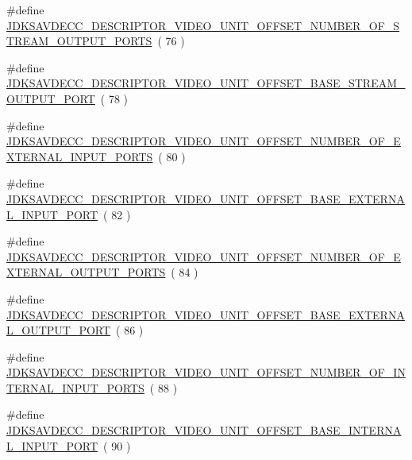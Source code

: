 \begin{DoxyCompactItemize}
\#define \hyperlink{group__descriptor__video_gac7fe011b0b2e1939152afdadbeada41d}{J\+D\+K\+S\+A\+V\+D\+E\+C\+C\+\_\+\+D\+E\+S\+C\+R\+I\+P\+T\+O\+R\+\_\+\+V\+I\+D\+E\+O\+\_\+\+U\+N\+I\+T\+\_\+\+O\+F\+F\+S\+E\+T\+\_\+\+N\+U\+M\+B\+E\+R\+\_\+\+O\+F\+\_\+\+S\+T\+R\+E\+A\+M\+\_\+\+O\+U\+T\+P\+U\+T\+\_\+\+P\+O\+R\+TS}~( 76 )
\item 
\#define \hyperlink{group__descriptor__video_ga338f69aa7d516eebf27652ef488e0ddb}{J\+D\+K\+S\+A\+V\+D\+E\+C\+C\+\_\+\+D\+E\+S\+C\+R\+I\+P\+T\+O\+R\+\_\+\+V\+I\+D\+E\+O\+\_\+\+U\+N\+I\+T\+\_\+\+O\+F\+F\+S\+E\+T\+\_\+\+B\+A\+S\+E\+\_\+\+S\+T\+R\+E\+A\+M\+\_\+\+O\+U\+T\+P\+U\+T\+\_\+\+P\+O\+RT}~( 78 )
\item 
\#define \hyperlink{group__descriptor__video_gac8a77b254c974dd066c13ee46e44e867}{J\+D\+K\+S\+A\+V\+D\+E\+C\+C\+\_\+\+D\+E\+S\+C\+R\+I\+P\+T\+O\+R\+\_\+\+V\+I\+D\+E\+O\+\_\+\+U\+N\+I\+T\+\_\+\+O\+F\+F\+S\+E\+T\+\_\+\+N\+U\+M\+B\+E\+R\+\_\+\+O\+F\+\_\+\+E\+X\+T\+E\+R\+N\+A\+L\+\_\+\+I\+N\+P\+U\+T\+\_\+\+P\+O\+R\+TS}~( 80 )
\item 
\#define \hyperlink{group__descriptor__video_gaf2e1ab9c5796bc2211191a29ca4585e6}{J\+D\+K\+S\+A\+V\+D\+E\+C\+C\+\_\+\+D\+E\+S\+C\+R\+I\+P\+T\+O\+R\+\_\+\+V\+I\+D\+E\+O\+\_\+\+U\+N\+I\+T\+\_\+\+O\+F\+F\+S\+E\+T\+\_\+\+B\+A\+S\+E\+\_\+\+E\+X\+T\+E\+R\+N\+A\+L\+\_\+\+I\+N\+P\+U\+T\+\_\+\+P\+O\+RT}~( 82 )
\item 
\#define \hyperlink{group__descriptor__video_ga4aed93d1545c2ea73f68e8aba44f9642}{J\+D\+K\+S\+A\+V\+D\+E\+C\+C\+\_\+\+D\+E\+S\+C\+R\+I\+P\+T\+O\+R\+\_\+\+V\+I\+D\+E\+O\+\_\+\+U\+N\+I\+T\+\_\+\+O\+F\+F\+S\+E\+T\+\_\+\+N\+U\+M\+B\+E\+R\+\_\+\+O\+F\+\_\+\+E\+X\+T\+E\+R\+N\+A\+L\+\_\+\+O\+U\+T\+P\+U\+T\+\_\+\+P\+O\+R\+TS}~( 84 )
\item 
\#define \hyperlink{group__descriptor__video_gadb2256708754bd25d9b731eb80addf35}{J\+D\+K\+S\+A\+V\+D\+E\+C\+C\+\_\+\+D\+E\+S\+C\+R\+I\+P\+T\+O\+R\+\_\+\+V\+I\+D\+E\+O\+\_\+\+U\+N\+I\+T\+\_\+\+O\+F\+F\+S\+E\+T\+\_\+\+B\+A\+S\+E\+\_\+\+E\+X\+T\+E\+R\+N\+A\+L\+\_\+\+O\+U\+T\+P\+U\+T\+\_\+\+P\+O\+RT}~( 86 )
\item 
\#define \hyperlink{group__descriptor__video_gaa4d68bd7591869919314268f9d0baa76}{J\+D\+K\+S\+A\+V\+D\+E\+C\+C\+\_\+\+D\+E\+S\+C\+R\+I\+P\+T\+O\+R\+\_\+\+V\+I\+D\+E\+O\+\_\+\+U\+N\+I\+T\+\_\+\+O\+F\+F\+S\+E\+T\+\_\+\+N\+U\+M\+B\+E\+R\+\_\+\+O\+F\+\_\+\+I\+N\+T\+E\+R\+N\+A\+L\+\_\+\+I\+N\+P\+U\+T\+\_\+\+P\+O\+R\+TS}~( 88 )
\item 
\#define \hyperlink{group__descriptor__video_gad9ab75e849620219e86d9ee9ef19ea3b}{J\+D\+K\+S\+A\+V\+D\+E\+C\+C\+\_\+\+D\+E\+S\+C\+R\+I\+P\+T\+O\+R\+\_\+\+V\+I\+D\+E\+O\+\_\+\+U\+N\+I\+T\+\_\+\+O\+F\+F\+S\+E\+T\+\_\+\+B\+A\+S\+E\+\_\+\+I\+N\+T\+E\+R\+N\+A\+L\+\_\+\+I\+N\+P\+U\+T\+\_\+\+P\+O\+RT}~( 90 )

\end{DoxyCompactItemize}
